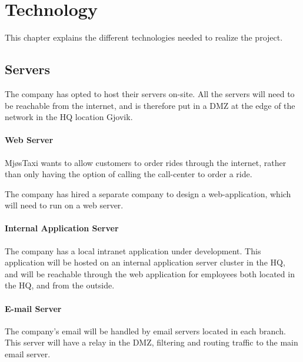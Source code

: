 \chapter{Technology} %
\label{chap:technology}


This chapter explains the different technologies needed to realize the project.

\section{Servers}
The company has opted to host their servers on-site.
All the servers will need to be reachable from the internet, and is therefore put in a DMZ at the edge of the network in the HQ location Gjovik.

\subsubsection{Web Server}
\vspace{-0.6em}
MjøsTaxi wants to allow customers to order rides through the internet, rather than only having the option of calling the call-center to order a ride.

The company has hired a separate company to design a web-application, which will need to run on a web server.

\subsubsection{Internal Application Server}
\vspace{-0.6em}
The company has a local intranet application under development. This application will be hosted on an internal application server cluster in the HQ, and will be reachable through the web application for employees both located in the HQ, and from the outside. %

\subsubsection{E-mail Server}
\vspace{-0.6em}
The company's email will be handled by email servers located in each branch.
This server will have a relay in the DMZ, filtering and routing traffic to the main email server.




